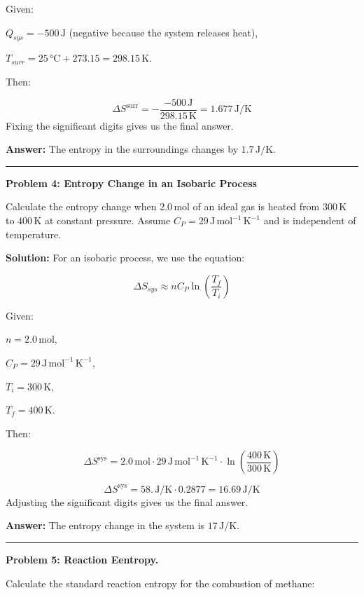 \documentclass[
  9pt,
]{extbook}
\theoremstyle{definition}
\theoremstyle{definition}
\theoremstyle{definition}
\theoremstyle{remark}
\begin{document}
Given:

\(Q_{sys} = -500\,\text{J}\) (negative because the system releases heat),

\(T_{surr} = 25\,\text{°C} + 273.15 = 298.15\,\text{K}\).

Then:

\[\Delta S^{\text{surr}} = -\frac{-500\,\text{J}}{298.15\,\text{K}} = 1.677\,\text{J/K}\]
Fixing the significant digits gives us the final answer.

\textbf{Answer:} The entropy in the surroundings changes by \(1.7\,\text{J/K}\).

\begin{center}\rule{0.5\linewidth}{0.5pt}\end{center}

\textbf{Problem 4: Entropy Change in an Isobaric Process}

Calculate the entropy change when \(2.0\,\text{mol}\) of an ideal gas is heated from \(300\,\text{K}\) to \(400\,\text{K}\) at constant pressure. Assume \(C_P = 29\,\text{J} \, \text{mol}^{-1} \, \text{K}^{-1}\) and is independent of temperature.

\textbf{Solution:} For an isobaric process, we use the equation:

\[\Delta S_{sys} \approx nC_P \ln \left(\frac{T_f}{T_i}\right)\]

Given:

\(n = 2.0\,\text{mol}\),

\(C_P = 29\,\text{J} \, \text{mol}^{-1} \, \text{K}^{-1}\),

\(T_i = 300\,\text{K}\),

\(T_f = 400\,\text{K}\).

Then:

\[\Delta S^{\text{sys}} = 2.0\,\text{mol} \cdot 29\,\text{J} \, \text{mol}^{-1} \, \text{K}^{-1} \cdot \ln \left(\frac{400\,\text{K}}{300\,\text{K}}\right)\]

\[\Delta S^{\text{sys}} = 58.\,\text{J/K} \cdot 0.2877 = 16.69\,\text{J/K}\]
Adjusting the significant digits gives us the final answer.

\textbf{Answer:} The entropy change in the system is \(17\,\text{J/K}\).

\begin{center}\rule{0.5\linewidth}{0.5pt}\end{center}

\textbf{Problem 5: Reaction Eentropy.}

Calculate the standard reaction entropy for the combustion of methane:
\end{document}
